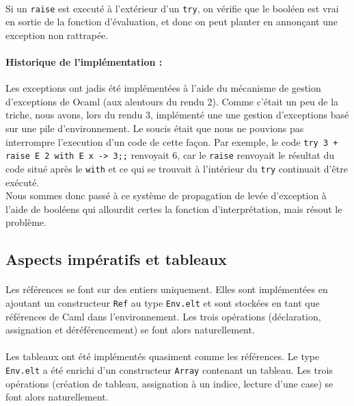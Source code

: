 \paragraph{} Si un \texttt{raise} est executé à l'extérieur d'un \texttt{try}, on vérifie que le booléen est vrai en sortie de la fonction d'évaluation, et donc on peut planter en annonçant une exception non rattrapée.

\paragraph{Historique de l'implémentation :} Les exceptions ont jadis été implémentées à l'aide du mécanisme de gestion d'exceptions de Ocaml (aux alentours du rendu 2). Comme c'était un peu de la triche, nous avons, lors du rendu 3, implémenté une une gestion d'exceptions basé sur une pile d'environnement. Le soucis était que nous ne pouvions pas interrompre l'execution d'un code de cette façon. Par exemple, le code \texttt{try 3 + raise E 2 with E x -> 3;;} renvoyait 6, car le \texttt{raise} renvoyait le résultat du code situé après le \texttt{with} et ce qui se trouvait à l'intérieur du \texttt{try} continuait d'être exécuté. \\
Nous sommes donc passé à ce système de propagation de levée d'exception à l'aide de booléens qui allourdit certes la fonction d'interprétation, mais résout le problème.

\subsection{Aspects impératifs et tableaux}

\paragraph{} Les références se font sur des entiers uniquement. Elles sont implémentées en ajoutant un constructeur \texttt{Ref} au type \texttt{Env.elt} et sont stockées en tant que références de Caml dans l'environnement. Les trois opérations (déclaration, assignation et déréférencement) se font alors naturellement.

\paragraph{} Les tableaux ont été implémentés quasiment comme les références. Le type \texttt{Env.elt} a été enrichi d'un constructeur \texttt{Array} contenant un tableau. Les trois opérations (création de tableau, assignation à un indice, lecture d'une case) se font alors naturellement.




